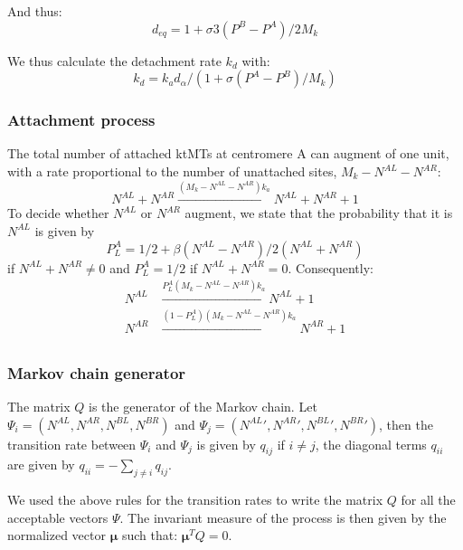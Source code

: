 \documentclass[a4paper,12pt]{article}
\begin{document}
And thus:
\begin{equation}
  \label{eq:deq}
  d_{eq} = 1 + \sigma 3 \left(P^B - P^A\right)/2M_k
\end{equation}

We thus calculate the detachment rate $k_d$ with:
\begin{equation}
  \label{eq:def_kf_markov}
  k_d  =   k_a d_{\alpha} / (1 + \sigma \left(P^A - P^B\right)/M_k) 
\end{equation}


\subsubsection{Attachment process}


The total number of attached ktMTs at centromere A can augment of one
unit, with a rate proportional to the number of unattached sites, $M_k
 -  N^{AL} -  N^{AR} $:
\begin{equation}
  N^{AL} + N^{AR} \xrightarrow{\left(M_k -
      N^{AL}-N^{AR}\right)k_a} N^{AL}+ N^{AR} + 1%
\end{equation}
To decide whether $N^{AL}$ or $N^{AR}$ augment, we state that the
probability that it is $N^{AL}$ is given by 
$$P_L^A = 1/2 + \beta\left(N^{AL} - N^{AR}\right)/2(N^{AL} + N^{AR})$$
if $N^{AL} + N^{AR} \neq 0$ and $P_L^A = 1/2$ if $N^{AL} + N^{AR} =
0$.  Consequently:
\begin{equation}
  \begin{aligned}
    N^{AL}&\xrightarrow{P_L^A\left(M_k -
        N^{AL}-N^{AR}\right)k_a} N^{AL} + 1\\
    N^{AR}&\xrightarrow{\left(1 - P_L^A\right)\left(M_k -
        N^{AL}-N^{AR}\right)k_a} N^{AR} + 1\\
  \end{aligned}
\end{equation}


\subsubsection{Markov chain generator}
\label{sec:mcg}

The matrix $Q$ is the generator of the Markov chain. Let $\Psi_i = (
N^{AL}, N^{AR}, N^{BL}, N^{BR})$ and $\Psi_j = (
{N^{AL}}', {N^{AR}}', {N^{BL}}', {N^{BR}}')$, then the transition rate between
$\Psi_i$ and $\Psi_j$ is given by $q_{ij}$ if $i \neq j$, the diagonal
terms $q_{ii}$ are given by $q_{ii} = - \sum_{j \neq i} q_{ij} $. 

We used the above rules for the transition rates to write the matrix
$Q$ for all the acceptable vectors $\Psi$. The invariant measure of
the process is then given by the normalized  vector
$\mathbf{\mu}$ such that: $\mathbf{\mu}^TQ = 0$.
\end{document}
